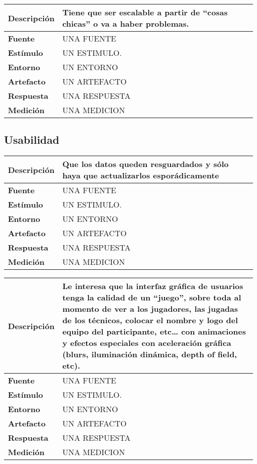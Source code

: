 \begin{center}
  \begin{tabular}{| l | p{10cm} | }
    \hline
  \textbf{Descripción} & Tiene que ser escalable a partir de “cosas chicas” o va a haber problemas. \\  \hline
  \textbf{Fuente} & UNA FUENTE\\  \hline
  \textbf{Estímulo} & UN ESTIMULO.\\  \hline
  \textbf{Entorno} & UN ENTORNO\\  \hline
  \textbf{Artefacto} & UN ARTEFACTO\\  \hline
  \textbf{Respuesta} & UNA RESPUESTA\\  \hline
  \textbf{Medición} & UNA MEDICION\\  \hline
  \end{tabular}
\end{center} 




\subsection{Usabilidad}

\begin{center}
  \begin{tabular}{| l | p{10cm} | }
    \hline
  \textbf{Descripción} & Que los datos queden resguardados y sólo haya que actualizarlos esporádicamente\\  \hline
  \textbf{Fuente} & UNA FUENTE\\  \hline
  \textbf{Estímulo} & UN ESTIMULO.\\  \hline
  \textbf{Entorno} & UN ENTORNO\\  \hline
  \textbf{Artefacto} & UN ARTEFACTO\\  \hline
  \textbf{Respuesta} & UNA RESPUESTA\\  \hline
  \textbf{Medición} & UNA MEDICION\\  \hline
  \end{tabular}
\end{center} 

\begin{center}
  \begin{tabular}{| l | p{10cm} | }
    \hline
  \textbf{Descripción} & Le interesa que la interfaz gráfica de usuarios tenga la calidad de un “juego”, sobre toda al momento de ver a los jugadores, las jugadas de los técnicos, colocar el nombre y logo del equipo del participante, etc… con animaciones y efectos especiales con aceleración gráfica (blurs, iluminación dinámica, depth of field, etc). \\  \hline
  \textbf{Fuente} & UNA FUENTE\\  \hline
  \textbf{Estímulo} & UN ESTIMULO.\\  \hline
  \textbf{Entorno} & UN ENTORNO\\  \hline
  \textbf{Artefacto} & UN ARTEFACTO\\  \hline
  \textbf{Respuesta} & UNA RESPUESTA\\  \hline
  \textbf{Medición} & UNA MEDICION\\  \hline
  \end{tabular}
\end{center} 

